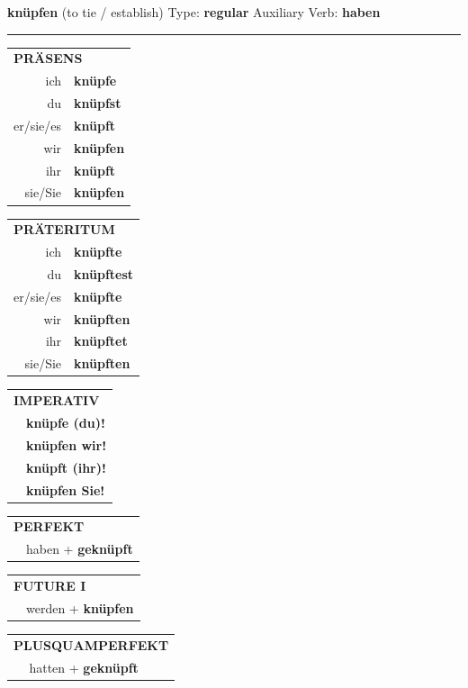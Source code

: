\documentclass[10pt,a4paper]{revtex4-2}
\begin{document}
\begin{verbbox}
{\Large \bf knüpfen} (to tie / establish) \hfill Type: \textbf{regular} \hfill Auxiliary Verb: \textbf{haben} 

\vspace{5pt}
\hrule
\vspace{5pt}

\begin{tabular}{rl}
\multicolumn{2}{l}{\textbf{PRÄSENS}}\\
ich & \textbf{knüpfe}\\
du & \textbf{knüpfst}\\
er/sie/es & \textbf{knüpft}\\
wir & \textbf{knüpfen}\\
ihr & \textbf{knüpft}\\
sie/Sie & \textbf{knüpfen}\\
\end{tabular}
\hfill
\begin{tabular}{rl}
\multicolumn{2}{l}{\textbf{PRÄTERITUM}}\\
ich & \textbf{knüpfte}\\
du & \textbf{knüpftest}\\
er/sie/es & \textbf{knüpfte}\\
wir & \textbf{knüpften}\\
ihr & \textbf{knüpftet}\\
sie/Sie & \textbf{knüpften}\\
\end{tabular}
\hfill
\begin{tabular}{rl}
\multicolumn{2}{l}{\textbf{IMPERATIV}}\\
& \textbf{knüpfe (du)!}\\
& \textbf{knüpfen wir!}\\
& \textbf{knüpft (ihr)!}\\
& \textbf{knüpfen Sie!}\\
\end{tabular}

\vspace{10pt}

\begin{tabular}{rl}
\multicolumn{2}{l}{\textbf{PERFEKT}}\\
& haben + \textbf{geknüpft}\\
\end{tabular}
\hfill
\begin{tabular}{rl}
\multicolumn{2}{l}{\textbf{FUTURE I}}\\
& werden + \textbf{knüpfen}\\
\end{tabular}
\hfill
\begin{tabular}{rl}
\multicolumn{2}{l}{\textbf{PLUSQUAMPERFEKT}}\\
& hatten + \textbf{geknüpft}\\
\end{tabular}


\end{verbbox}
\end{document}
